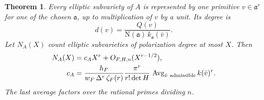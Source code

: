 \documentclass[11pt,letterpaper]{amsart}
\newtheorem{theorem}{Theorem}[section]
\theoremstyle{definition}
\numberwithin{equation}{section}
\newcommand{\NN}{\mathrm N}
\newcommand{\av}{\operatorname{Avg}}
\begin{document}
\begin{theorem}\label{thm:height}
Every elliptic subvariety of \(A\) is represented by one primitive
\(v\in\mathfrak a^r\) for one of the chosen \(\mathfrak a\), up to
multiplication of \(v\) by a unit. Its degree is
\begin{equation}\label{eq:degree}
 d(v)=\frac{Q(v)}{\NN(\mathfrak a)\,k_{\mathfrak a}(\bar v)}.
\end{equation}
Let \(N_A(X)\) count elliptic subvarieties of polarization degree at
most \(X\). Then
\begin{align}
 N_A(X)&=c_A X^r+O_{F,H,n}(X^{r-1/2}), \label{eq:main}\\
 c_A&=\frac{h_F}{w_F\,\Delta^r\,\zeta_F(r)}
        \frac{\pi^r}{r!\det H}\,
        \av_{\bar v\ {\rm admissible}} k(\bar v)^r. \label{eq:constant}
\end{align}
The last average factors over the rational primes dividing \(n\).
\end{theorem}
\end{document}
